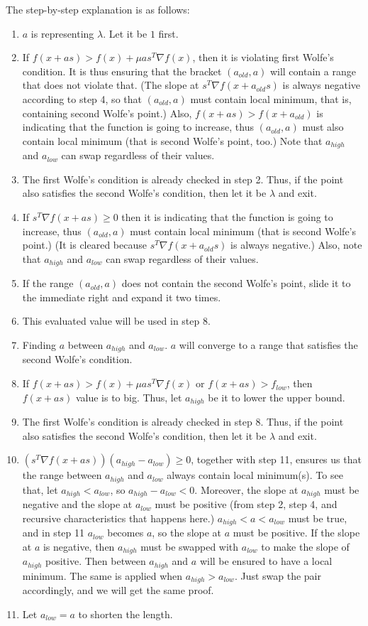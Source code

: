 \documentclass{article}
\begin{document}
The step-by-step explanation is as follows:
\begin{enumerate}
    \item $a$ is representing $\lambda$. Let it be $1$ first.
    \item If $f(x + as) > f(x) + \mu a s^T \nabla f(x)$, then it is violating first Wolfe's condition. It is thus ensuring that the bracket $(a_{old},a)$ will contain a range that does not violate that. (The slope at $s^T \nabla f(x + a_{old}s)$ is always negative according to step 4, so that $(a_{old},a)$ must contain local minimum, that is, containing second Wolfe's point.) Also, $f(x + a s) > f(x + a_{old})$ is indicating that the function is going to increase, thus $(a_{old},a)$ must also contain local minimum (that is second Wolfe's point, too.) Note that $a_{high}$ and $a_{low}$ can swap regardless of their values.
    \item The first Wolfe's condition is already checked in step 2. Thus, if the point also satisfies the second Wolfe's condition, then let it be $\lambda$ and exit.
    \item If $s^T \nabla f(x + as) \geq 0$ then it is indicating that the function is going to increase, thus $(a_{old},a)$ must contain local minimum (that is second Wolfe's point.) (It is cleared because $s^T \nabla f(x + a_{old}s)$ is always negative.) Also, note that $a_{high}$ and $a_{low}$ can swap regardless of their values.
    \item If the range $(a_{old},a)$ does not contain the second Wolfe's point, slide it to the immediate right and expand it two times.
    \item This evaluated value will be used in step 8.
    \item Finding $a$ between $a_{high}$ and $a_{low}$. $a$ will converge to a range that satisfies the second Wolfe's condition.
    \item If $f(x + as) > f(x) + \mu a s^T \nabla f(x)$ or $f(x + a s) > f_{low}$, then $f(x + a s)$ value is to big. Thus, let $a_{high}$ be it to lower the upper bound.
    \item The first Wolfe's condition is already checked in step 8. Thus, if the point also satisfies the second Wolfe's condition, then let it be $\lambda$ and exit.
    \item $(s^T \nabla f(x + as))(a_{high} - a_{low}) \geq 0$, together with step 11, ensures us that the range between $a_{high}$ and $a_{low}$ always contain local minimum(s). To see that, let $a_{high} < a_{low}$, so $a_{high} - a_{low} < 0$. Moreover, the slope at $a_{high}$ must be negative and the slope at $a_{low}$ must be positive (from step 2, step 4, and recursive characteristics that happens here.) $a_{high} < a < a_{low}$ must be true, and in step 11 $a_{low}$ becomes $a$, so the slope at $a$ must be positive. If the slope at $a$ is negative, then $a_{high}$ must be swapped with $a_{low}$ to make the slope of $a_{high}$ positive. Then between $a_{high}$ and $a$ will be ensured to have a local minimum. The same is applied when $a_{high} > a_{low}$. Just swap the pair accordingly, and we will get the same proof.
    \item Let $a_{low} = a$ to shorten the length.
\end{enumerate}
\end{document}
